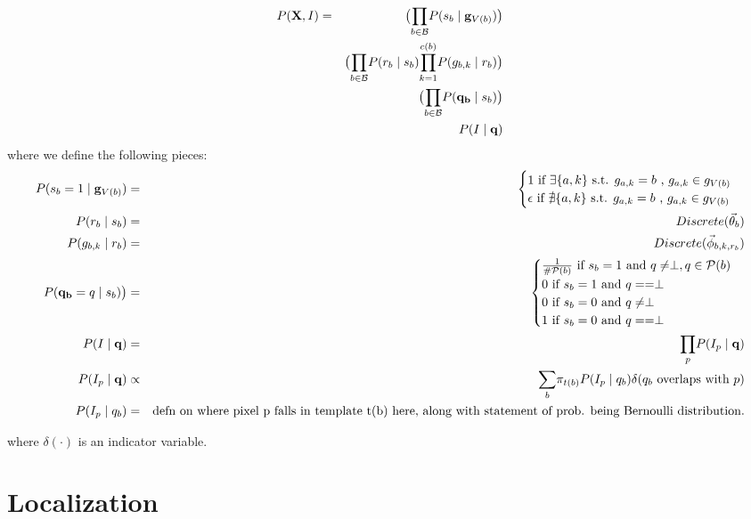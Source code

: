 \documentclass[11pt]{article}
\newcommand{\Pose}{{\cal P}}
\newcommand{\X}{\mathbf{X}}
\newcommand{\B}{\cal B}
\begin{document}
\begin{eqnarray}
P(\X, I) &=& \big({\displaystyle \prod_{b \in {\B}}} P(s_b \mid \mathbf{g}_{V(b)}) \big ) \\
& &\big( {\displaystyle \prod_{b \in {\B}}} P(r_b \mid s_b) {\displaystyle \prod_{k=1}^{c(b)}} P(g_{b,k} \mid r_b) \big) \nonumber \\
& &\big( {\displaystyle \prod_{b \in {\B}}} P(\mathbf{q_b} \mid s_b)\big) \nonumber \\
& & P(I \mid \mathbf{q}) \nonumber 
\end{eqnarray}
%
where we define the following pieces:
%
\begin{eqnarray}
P(s_b = 1 \mid \mathbf{g}_{V(b)}) &=&  \begin{cases} 1 \mbox{ if } \exists \{a,k\} \mbox{ s.t. } g_{a,k} = b \mbox{ , } g_{a,k} \in {g}_{V(b)} \\
\epsilon \mbox{ if } \nexists \{a,k\} \mbox{ s.t. } g_{a,k} = b \mbox{ , } g_{a,k} \in {g}_{V(b)} \end{cases} \\
P(r_b \mid s_b) &=& Discrete(\vec{\theta}_b) \\
P(g_{b,k} \mid r_b) &=& Discrete(\vec{\phi}_{b,k,r_b}) \\
P(\mathbf{q_b} = q \mid s_b)\big) &=& \begin{cases} \frac{1}{\#\Pose(b)} \mbox{ if } s_b = 1 \mbox{ and } q \neq \perp, q \in \Pose(b) \\
                                                   0 \mbox{ if } s_b = 1 \mbox{ and } q == \perp \\
                                                   0 \mbox{ if } s_b = 0 \mbox{ and } q \neq \perp \\
                                                   1 \mbox{ if } s_b = 0 \mbox{ and } q == \perp  \end{cases} \\
P(I \mid \mathbf{q}) &=& {\displaystyle \prod_{p}} P(I_p \mid \mathbf{q}) \\
P(I_p \mid \mathbf{q}) &\propto& {\displaystyle \sum_{b}} \pi_{t(b)}P(I_p \mid q_b) \delta(q_b \text{ overlaps with } p) \\
P(I_p \mid q_b) &=& \text{defn on where pixel p falls in template t(b) here, along with statement of prob. being Bernoulli distribution}.
\end{eqnarray}

where $\delta(\cdot)$ is an indicator variable.


\section*{Localization}
\end{document}
